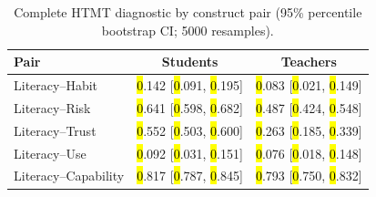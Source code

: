 \documentclass[sustainability,article,accept,moreauthors]{Definitions/mdpi}
\begin{document}
\begin{table}[H]
\caption{Complete HTMT diagnostic by construct pair (95\% percentile bootstrap CI; 5000 resamples).}
\label{tab:htmt}
\small


\setlength{\tabcolsep}{8.9mm}\begin{tabular}{lcc}
\toprule
\textbf{Pair} & \textbf{Students} & \textbf{Teachers}\\
\midrule
Literacy--Habit &\hl{0}.142 [\hl{0}.091, \hl{0}.195] &\hl{0}.083 [\hl{0}.021, \hl{0}.149] \\
Literacy--Risk &\hl{0}.641 [\hl{0}.598, \hl{0}.682] &\hl{0}.487 [\hl{0}.424, \hl{0}.548] \\
Literacy--Trust &\hl{0}.552 [\hl{0}.503, \hl{0}.600] &\hl{0}.263 [\hl{0}.185, \hl{0}.339] \\
Literacy--Use &\hl{0}.092 [\hl{0}.031, \hl{0}.151] &\hl{0}.076 [\hl{0}.018, \hl{0}.148] \\
Literacy--Capability &\hl{0}.817 [\hl{0}.787, \hl{0}.845] &\hl{0}.793 [\hl{0}.750, \hl{0}.832] \\



\end{tabular}
\end{table}
\end{document}
